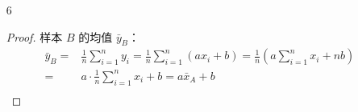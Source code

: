 \documentclass[normal,cn]{elegantnote}
\begin{document}
\begin{enumerate}
\begin{proof}
            （另一种思路）
            \begin{equation*}
                \begin{aligned}
                    s_{n+1}^{2}= & \frac{1}{n}\sum_{i=1}^{n+1}\left(x_{i}-\bar{x}_{n+1}\right)^{2}=\frac{1}{n}\sum_{i=1}^{n+1}\left[(x_{i}-\bar{x}_n)+(\bar{x}_n-\bar{x}_{n+1})\right]^{2}                                                                                          \\
                    =            & \frac{1}{n}\left[\sum_{i=1}^{n+1}\left(x_{i}-\bar{x}_{n}\right)^{2}\right]+\frac{2}{n}\left(\bar{x}_{n}-\bar{x}_{n+1}\right)\sum_{i=1}^{n+1}\left(x_{i}-\bar{x}_{n}\right)+\frac{1}{n}\sum_{i=1}^{n+1}\left(\bar{x}_{n}-\bar{x}_{n+1}\right)^{2} \\
                    =            & \frac{1}{n}\left[\sum_{i=1}^{n+1}\left(x_{i}-\bar{x}_{n}\right)^{2}\right]-\frac{n+1}{n}\left(\bar{x}_{n}-\bar{x}_{n+1}\right)^{2}                                                                                                               \\
                    =            & \frac{1}{n}\left[\sum_{i=1}^{n}\left(x_{i}-\bar{x}_{n}\right)^{2}+\left(x_{n+1}-\bar{x}_{n}\right)^{2}\right]-\frac{n+1}{n}\frac{1}{(n+1)^{2}}\left(x_{n+1}-\bar{x}_{n}\right)^{2}                                                               \\
                    =            & \frac{1}{n}\left[(n-1) \frac{1}{n-1} \sum_{i=1}^{n}\left(x_{i}-\bar{x}_{n}\right)^{2}+\frac{n}{n+1}\left(x_{n+1}-\bar{x}_{n}\right)^{2}\right]                                                                                                   \\
                    =            & \frac{n-1}{n} s_{n}^{2}+\frac{1}{n+1}\left(x_{n+1}-\bar{x}_{n}\right)^{2}
                \end{aligned}
            \end{equation*}
        \end{proof}

    \item[6]
        \begin{proof}
            样本 $B$ 的均值 $\bar{y}_{B}$：
            \begin{equation*}
                \begin{aligned}
                    \bar{y}_{B}= & \frac{1}{n}\sum_{i=1}^{n}y_{i}=\frac{1}{n}\sum_{i=1}^{n}\left(ax_{i}+b\right)=\frac{1}{n}\left(a\sum_{i=1}^{n}x_{i}+nb\right) \\
                    =            & a\cdot\frac{1}{n}\sum_{i=1}^{n}x_{i}+b=a\bar{x}_{A}+b                                                                         \\
                \end{aligned}
            \end{equation*}


\end{proof}
\end{enumerate}
\end{document}
